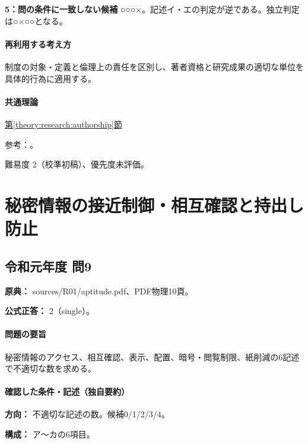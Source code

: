 \noindent\textbf{5：問の条件に一致しない候補} ○○○×。記述イ・エの判定が逆である。独立判定は○×○○となる。\par

\paragraph{再利用する考え方} 制度の対象・定義と倫理上の責任を区別し、著者資格と研究成果の適切な単位を具体的行為に適用する。

\paragraph{共通理論} \hyperref[theory:research:authorship]{第\ref*{theory:research:authorship}節}

\par 参考：\cite{jsps_integrity2025}。

\par 難易度 2（校準初稿）、優先度未評価。

\section{秘密情報の接近制御・相互確認と持出し防止}

\subsection{令和元年度 問9}
\label{q:r01-reg-apt-09}

\noindent\textbf{原典：} sources/R01/aptitude.pdf、PDF物理10頁。

\textbf{公式正答：} 2（single）。

\paragraph{問題の要旨} 秘密情報のアクセス、相互確認、表示、配置、暗号・閲覧制限、紙削減の6記述で不適切な数を求める。

\paragraph{確認した条件・記述（独自要約）}\mbox{}\par

\noindent\textbf{方向：} 不適切な記述の数。候補0/1/2/3/4。\par

\noindent\textbf{構成：} ア〜カの6項目。\par

